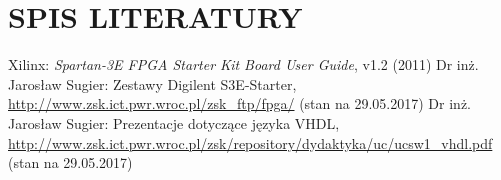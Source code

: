 \documentclass[11pt]{article}
\begin{document}
\newpage

\section{SPIS LITERATURY}

\begin{thebibliography}{99}
 Xilinx: \textit{Spartan-3E FPGA Starter Kit Board User Guide}, v1.2 (2011)
 Dr inż. Jarosław Sugier: Zestawy Digilent S3E-Starter, \url{http://www.zsk.ict.pwr.wroc.pl/zsk_ftp/fpga/} (stan na 29.05.2017)
 Dr inż. Jarosław Sugier: Prezentacje dotyczące języka VHDL, \url{http://www.zsk.ict.pwr.wroc.pl/zsk/repository/dydaktyka/uc/ucsw1_vhdl.pdf} (stan na 29.05.2017)
\end{thebibliography}

\listoffigures

\listoftables
\end{document}
